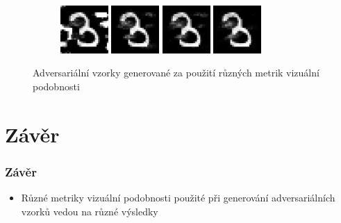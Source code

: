 \documentclass[czech]{beamer}
\begin{document}
\begin{frame}
\begin{figure}
\begin{subfigure}[b]{\textwidth}
        \end{subfigure}
        \begin{subfigure}[b]{\textwidth}
            \centering
            \includegraphics[width=0.2\textwidth]{Images/d5_0.1.png}
            \includegraphics[width=0.2\textwidth]{Images/d13_0.1.png}
            \includegraphics[width=0.2\textwidth]{Images/d21_0.1.png}
            \includegraphics[width=0.2\textwidth]{Images/d28_0.1.png}
        \end{subfigure}
        
        \centering
        \caption{Adversariální vzorky generované za použití různých metrik vizuální podobnosti}
        \label{allgen}
    \end{figure}
\end{frame}

\section*{Závěr}

\begin{frame}
    \frametitle{Závěr}
    \begin{itemize}
        \item Různé metriky vizuální podobnosti použité při generování adversariálních vzorků vedou na různé výsledky
    \end{itemize}
\end{frame}
\end{document}
